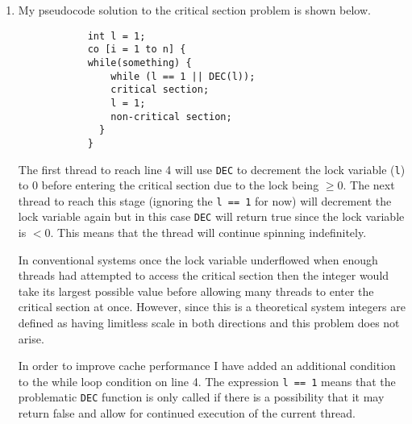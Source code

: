\documentclass[12pt, a4paper]{article}
\begin{document}
\begin{enumerate}

    \item

        My pseudocode solution to the critical section problem is shown below.

        \begin{verbatim}
            int l = 1;
            co [i = 1 to n] {
            while(something) {
                while (l == 1 || DEC(l));
                critical section;
                l = 1;
                non-critical section;
              }
            }
        \end{verbatim}

        The first thread to reach line 4 will use \texttt{DEC} to decrement the
        lock variable (\texttt{l}) to 0 before entering the critical section
        due to the lock being $\geq 0$. The next thread to reach this stage
        (ignoring the \texttt{l == 1} for now) will decrement the lock variable
        again but in this case \texttt{DEC} will return true since the lock
        variable is $< 0$. This means that the thread will continue spinning
        indefinitely.

        In conventional systems once the lock variable underflowed when enough
        threads had attempted to access the critical section then the integer
        would take its largest possible value before allowing many threads to
        enter the critical section at once. However, since this is
        a theoretical system integers are defined as having limitless scale in
        both directions and this problem does not arise.

        In order to improve cache performance I have added an additional
        condition to the while loop condition on line 4. The expression
        \texttt{l == 1} means that the problematic \texttt{DEC} function is
        only called if there is a possibility that it may return false and
        allow for continued execution of the current thread.

\end{enumerate}
\end{document}
